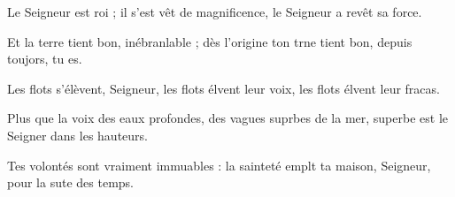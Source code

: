 \item Le Seigneur est roi ;\pscross{} il s’est vêt de magnificence,\psstar{} le Seigneur a revêt sa force. 
\item Et la terre tient bon, inébranlable ;\pscross{} dès l’origine ton trne tient bon,\psstar{} depuis toujors, tu es.
\item Les flots s’élèvent, Seigneur,\pscross{} les flots élvent leur voix,\psstar{} les flots élvent leur fracas.
\item Plus que la voix des eaux profondes,\pscross{} des vagues suprbes de la mer,\psstar{} superbe est le Seigner dans les hauteurs.
\item Tes volontés sont vraiment immuables :\pscross{} la sainteté emplt ta maison,\psstar{} Seigneur, pour la sute des temps.
